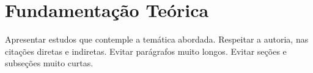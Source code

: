 \chapter{Fundamentação Teórica}
Apresentar estudos que contemple a temática abordada. Respeitar a autoria, nas citações diretas e indiretas. Evitar parágrafos muito longos. Evitar seções e subseções muito curtas.
